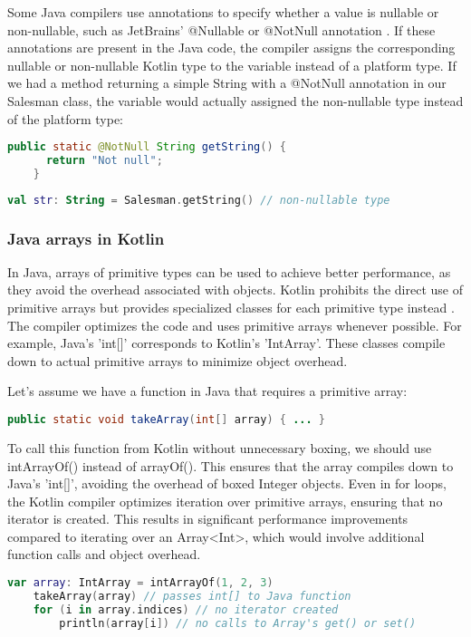 \documentclass[a4paper, 11pt]{article}
\begin{document}
  Some Java compilers use annotations \cite{interop-nullability-annotations} to specify whether a value is nullable or non-nullable, such as JetBrains' @Nullable or @NotNull annotation \cite{JetBrains-annotations}. If these annotations are present in the Java code, the compiler assigns the corresponding nullable or non-nullable Kotlin type to the variable instead of a platform type. If we had a method returning a simple String with a @NotNull annotation in our Salesman class, the variable would actually assigned the non-nullable type instead of the platform type:
  \begin{lstlisting}[language=Java]
    public static @NotNull String getString() {
      return "Not null";
    }
  \end{lstlisting}
  \begin{lstlisting}[language=Kotlin]
    val str: String = Salesman.getString() // non-nullable type
  \end{lstlisting}

\subsubsection{Java arrays in Kotlin}
  In Java, arrays of primitive types can be used to achieve better performance, as they avoid the overhead associated with objects. Kotlin prohibits the direct use of primitive arrays but provides specialized classes for each primitive type instead \cite{interop-arrays}. The compiler optimizes the code and uses primitive arrays whenever possible. For example, Java's 'int[]' corresponds to Kotlin's 'IntArray'. These classes compile down to actual primitive arrays to minimize object overhead.

  Let's assume we have a function in Java that requires a primitive array:
  \begin{lstlisting}[language=Java]
    public static void takeArray(int[] array) { ... }
  \end{lstlisting}
  To call this function from Kotlin without unnecessary boxing, we should use intArrayOf() instead of arrayOf(). This ensures that the array compiles down to Java's 'int[]', avoiding the overhead of boxed Integer objects. Even in for loops, the Kotlin compiler optimizes iteration over primitive arrays, ensuring that no iterator is created. This results in significant performance improvements compared to iterating over an Array<Int>, which would involve additional function calls and object overhead.
  \begin{lstlisting}[language=Kotlin]
    var array: IntArray = intArrayOf(1, 2, 3)
    takeArray(array) // passes int[] to Java function
    for (i in array.indices) // no iterator created
        println(array[i]) // no calls to Array's get() or set()
  \end{lstlisting}
\end{document}
